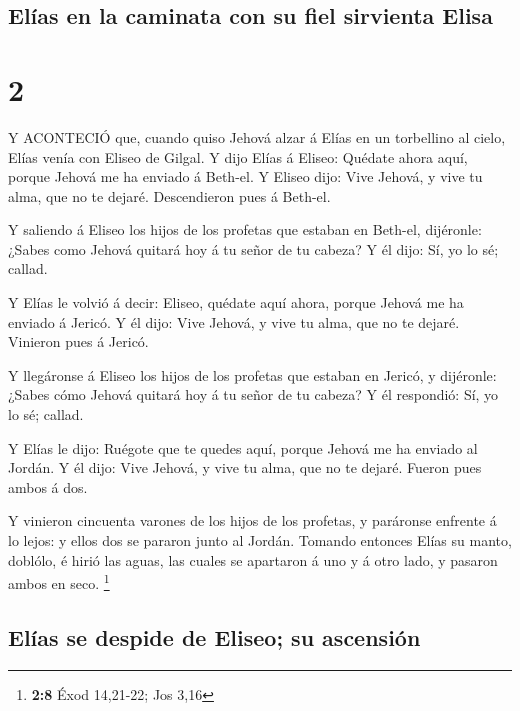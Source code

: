 \hypertarget{eluxedas-en-la-caminata-con-su-fiel-sirvienta-elisa}{%
\subsection{Elías en la caminata con su fiel sirvienta
Elisa}\label{eluxedas-en-la-caminata-con-su-fiel-sirvienta-elisa}}

\hypertarget{section-1}{%
\section{2}\label{section-1}}

 Y ACONTECIÓ que, cuando quiso Jehová alzar á Elías en un
torbellino al cielo, Elías venía con Eliseo de Gilgal.  Y
dijo Elías á Eliseo: Quédate ahora aquí, porque Jehová me ha enviado á
Beth-el. Y Eliseo dijo: Vive Jehová, y vive tu alma, que no te dejaré.
Descendieron pues á Beth-el.

 Y saliendo á Eliseo los hijos de los profetas que estaban
en Beth-el, dijéronle: ¿Sabes como Jehová quitará hoy á tu señor de tu
cabeza? Y él dijo: Sí, yo lo sé; callad.

 Y Elías le volvió á decir: Eliseo, quédate aquí ahora,
porque Jehová me ha enviado á Jericó. Y él dijo: Vive Jehová, y vive tu
alma, que no te dejaré. Vinieron pues á Jericó.

 Y llegáronse á Eliseo los hijos de los profetas que estaban
en Jericó, y dijéronle: ¿Sabes cómo Jehová quitará hoy á tu señor de tu
cabeza? Y él respondió: Sí, yo lo sé; callad.

 Y Elías le dijo: Ruégote que te quedes aquí, porque Jehová
me ha enviado al Jordán. Y él dijo: Vive Jehová, y vive tu alma, que no
te dejaré. Fueron pues ambos á dos.

 Y vinieron cincuenta varones de los hijos de los profetas,
y paráronse enfrente á lo lejos: y ellos dos se pararon junto al Jordán.
 Tomando entonces Elías su manto, doblólo, é hirió las
aguas, las cuales se apartaron á uno y á otro lado, y pasaron ambos en
seco. \footnote{\textbf{2:8} Éxod 14,21-22; Jos 3,16}

\hypertarget{eluxedas-se-despide-de-eliseo-su-ascensiuxf3n}{%
\subsection{Elías se despide de Eliseo; su
ascensión}\label{eluxedas-se-despide-de-eliseo-su-ascensiuxf3n}}

